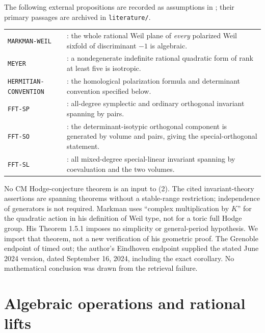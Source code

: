 \documentclass[11pt]{article}
\theoremstyle{remark}
\begin{document}
The following external propositions are recorded as assumptions in
; their primary passages are archived in
\texttt{literature/}.
\begin{center}\small
\begin{tabular}{p{}p{}}
\texttt{MARKMAN-WEIL} &
\cite[Theorem 1.5.1]{Markman}: the whole rational Weil plane of
\emph{every} polarized Weil sixfold of discriminant $-1$ is algebraic.\\
\texttt{MEYER} &
\cite[Corollary 3.3.4]{PS}: a nondegenerate indefinite rational
quadratic form of rank at least five is isotropic.\\
\texttt{HERMITIAN-}\newline\texttt{CONVENTION} &
\cite[Lemma 5.2(2)--(5), author version]{vG}: the homological
polarization formula and determinant convention specified below.\\
\texttt{FFT-SP} &
\cite[Theorem 4.1 and Corollary 4.2]{LZ15}: all-degree
symplectic and ordinary orthogonal invariant spanning by pairs.\\
\texttt{FFT-SO} &
\cite[Theorem 2.1, Remark 2.2, Example 4.1, Corollary 4.2]{LZ17}:
the determinant-isotypic orthogonal component is generated by volume
and pairs, giving the special-orthogonal statement.\\
\texttt{FFT-SL} &
\cite[Section 5, author PDF p. 10]{Sch}: all mixed-degree
special-linear invariant spanning by coevaluation and the two volumes.
\end{tabular}
\end{center}
No CM Hodge-conjecture theorem is an input to (2). The cited
invariant-theory assertions are spanning theorems without a stable-range
restriction; independence of generators is not required.
Markman uses ``complex multiplication by $K$'' for the quadratic action
in his definition of Weil type, not for a toric full Hodge group.
His Theorem 1.5.1 imposes no simplicity or general-period hypothesis.
We import that theorem, not a new verification of his geometric proof.
The Grenoble endpoint of \cite{PS} timed out; the author's Eindhoven
endpoint supplied the stated June 2024 version, dated September 16, 2024,
including the exact corollary. No mathematical conclusion was drawn from
the retrieval failure.

\section{Algebraic operations and rational lifts}
\end{document}
